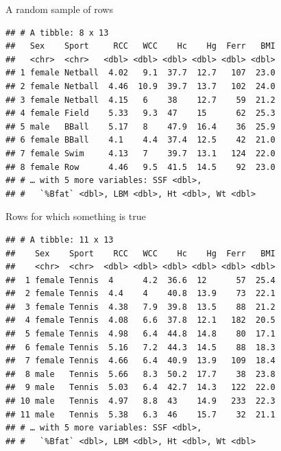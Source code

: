\documentclass[ignorenonframetext,]{beamer}
\newenvironment{Shaded}{\begin{snugshade}}{\end{snugshade}}
\newcommand{\DecValTok}[1]{\textcolor[rgb]{0.00,0.00,0.81}{#1}}
\newcommand{\KeywordTok}[1]{\textcolor[rgb]{0.13,0.29,0.53}{\textbf{#1}}}
\newcommand{\NormalTok}[1]{#1}
\newcommand{\OperatorTok}[1]{\textcolor[rgb]{0.81,0.36,0.00}{\textbf{#1}}}
\newcommand{\StringTok}[1]{\textcolor[rgb]{0.31,0.60,0.02}{#1}}
\begin{document}
\begin{frame}[fragile]{A random sample of rows}
\protect\hypertarget{a-random-sample-of-rows}{}

\begin{Shaded}
\end{Shaded}

\begin{verbatim}
## # A tibble: 8 x 13
##   Sex    Sport     RCC   WCC    Hc    Hg  Ferr   BMI
##   <chr>  <chr>   <dbl> <dbl> <dbl> <dbl> <dbl> <dbl>
## 1 female Netball  4.02   9.1  37.7  12.7   107  23.0
## 2 female Netball  4.46  10.9  39.7  13.7   102  24.0
## 3 female Netball  4.15   6    38    12.7    59  21.2
## 4 female Field    5.33   9.3  47    15      62  25.3
## 5 male   BBall    5.17   8    47.9  16.4    36  25.9
## 6 female BBall    4.1    4.4  37.4  12.5    42  21.0
## 7 female Swim     4.13   7    39.7  13.1   124  22.0
## 8 female Row      4.46   9.5  41.5  14.5    92  23.0
## # … with 5 more variables: SSF <dbl>,
## #   `%Bfat` <dbl>, LBM <dbl>, Ht <dbl>, Wt <dbl>
\end{verbatim}

\end{frame}

\begin{frame}[fragile]{Rows for which something is true}
\protect\hypertarget{rows-for-which-something-is-true}{}

\footnotesize

\begin{Shaded}
\end{Shaded}

\begin{verbatim}
## # A tibble: 11 x 13
##    Sex    Sport    RCC   WCC    Hc    Hg  Ferr   BMI
##    <chr>  <chr>  <dbl> <dbl> <dbl> <dbl> <dbl> <dbl>
##  1 female Tennis  4      4.2  36.6  12      57  25.4
##  2 female Tennis  4.4    4    40.8  13.9    73  22.1
##  3 female Tennis  4.38   7.9  39.8  13.5    88  21.2
##  4 female Tennis  4.08   6.6  37.8  12.1   182  20.5
##  5 female Tennis  4.98   6.4  44.8  14.8    80  17.1
##  6 female Tennis  5.16   7.2  44.3  14.5    88  18.3
##  7 female Tennis  4.66   6.4  40.9  13.9   109  18.4
##  8 male   Tennis  5.66   8.3  50.2  17.7    38  23.8
##  9 male   Tennis  5.03   6.4  42.7  14.3   122  22.0
## 10 male   Tennis  4.97   8.8  43    14.9   233  22.3
## 11 male   Tennis  5.38   6.3  46    15.7    32  21.1
## # … with 5 more variables: SSF <dbl>,
## #   `%Bfat` <dbl>, LBM <dbl>, Ht <dbl>, Wt <dbl>
\end{verbatim}

\normalsize

\end{frame}
\end{document}
